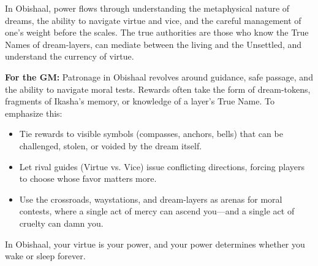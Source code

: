 \begin{tcolorbox}[colback=black!3,colframe=black!40!white,title={Patronage \& Power},breakable]
In Obishaal, power flows through understanding the metaphysical nature of dreams, the ability to navigate virtue and vice, and the careful management of one's weight before the scales. The true authorities are those who know the True Names of dream-layers, can mediate between the living and the Unsettled, and understand the currency of virtue.

\textbf{For the GM:}  
Patronage in Obishaal revolves around guidance, safe passage, and the ability to navigate moral tests. Rewards often take the form of dream-tokens, fragments of Ikasha's memory, or knowledge of a layer's True Name. To emphasize this:
\begin{itemize}
\item Tie rewards to visible symbols (compasses, anchors, bells) that can be challenged, stolen, or voided by the dream itself.
\item Let rival guides (Virtue vs. Vice) issue conflicting directions, forcing players to choose whose favor matters more.
\item Use the crossroads, waystations, and dream-layers as arenas for moral contests, where a single act of mercy can ascend you---and a single act of cruelty can damn you.
\end{itemize}
In Obishaal, your virtue is your power, and your power determines whether you wake or sleep forever.
\end{tcolorbox}

